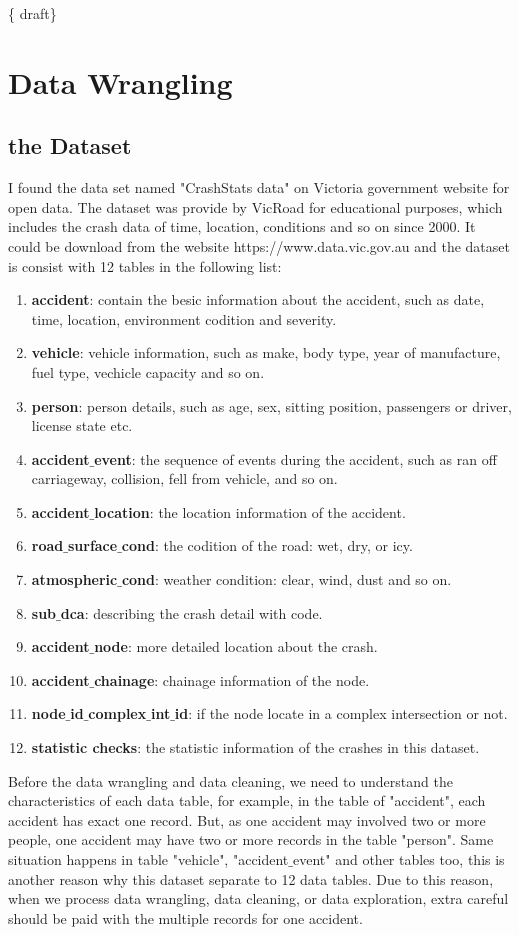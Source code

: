 \documentclass[11pt]{article}
\theoremstyle{definition}
\begin{document}
\{ draft\}


\section{Data Wrangling} 
\label{dataWrangling}
\subsection{the Dataset}
I found the data set named "CrashStats data" on Victoria government website for open data. The dataset was provide by VicRoad for educational purposes, which includes the crash data of time, location, conditions and so on since 2000. It could be download from the website https://www.data.vic.gov.au and the dataset is consist with 12 tables in the following list:
\begin{enumerate}
	\item \textbf{accident}:	contain the besic information about the accident, such as date, time, location, environment codition and severity.
	\item \textbf{vehicle}:	vehicle information, such as make, body type, year of manufacture, fuel type, vechicle capacity and so on.
	\item \textbf{person}:	person details, such as age, sex, sitting position, passengers or driver, license state etc.	
	\item \textbf{accident$\_$event}: the sequence of events during the accident, such as ran off carriageway, collision, fell from vehicle, and so on.
	\item \textbf{accident$\_$location}:	the location information of the accident.
	\item \textbf{road$\_$surface$\_$cond}:	the codition of the road: wet, dry, or icy.
	\item \textbf{atmospheric$\_$cond}:	weather condition: clear, wind, dust and so on.
	\item \textbf{sub$\_$dca}:	describing the crash detail with code.
	\item \textbf{accident$\_$node}:	more detailed location about the crash.
	\item \textbf{accident$\_$chainage}:	chainage information of the node.
	\item \textbf{node$\_$id$\_$complex$\_$int$\_$id}:	if the node locate in a complex intersection or not.
	\item \textbf{statistic checks}:	the statistic information of the crashes in this dataset.
\end{enumerate}
Before the data wrangling and data cleaning, we need to understand the characteristics of each data table, for example, in the table of "accident", each accident has exact one record. But, as one accident may involved two or more people, one accident may have two or more records in the table "person". Same situation happens in table "vehicle", "accident$\_$event" and other tables too, this is another reason why this dataset separate to 12 data tables. Due to this reason, when we process data wrangling, data cleaning, or data exploration, extra careful should be paid with the multiple records for one accident. 
	
\end{document}
